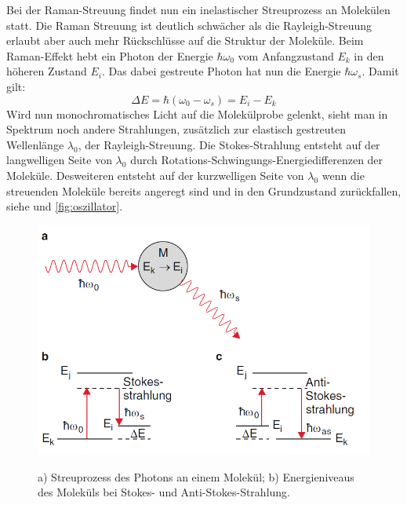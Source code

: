 \documentclass[.../bericht]{subfilies}
\begin{document}
      Bei der Raman-Streuung findet nun ein inelastischer Streuprozess an Molekülen statt. Die Raman Streuung ist deutlich schwächer als die Rayleigh-Streuung erlaubt aber auch mehr Rückschlüsse auf die Struktur der Moleküle. Beim Raman-Effekt hebt ein Photon der Energie $\hbar \omega_0$ vom Anfangzustand $E_k$ in den höheren Zustand $E_i$. Das dabei gestreute Photon hat nun die Energie $\hbar \omega_s$. Damit gilt:
      \begin{equation*}
        \Delta E= \hbar (\omega_0-\omega_s)=E_i-E_k
      \end{equation*}
      Wird nun monochromatisches Licht auf die Molekülprobe gelenkt, sieht man in Spektrum noch andere Strahlungen, zusätzlich zur elastisch gestreuten Wellenlänge $\lambda_0$, der Rayleigh-Streuung. Die Stokes-Strahlung entsteht auf der langwelligen Seite von $\lambda_0$  durch Rotations-Schwingungs-Energiedifferenzen der Moleküle. Desweiteren entsteht auf der kurzwelligen Seite von $\lambda_0$ wenn die streuenden Moleküle bereits angeregt sind und in den Grundzustand zurückfallen, siehe und \cref{fig:oszillator}.
      \begin{figure}[tb]
        \begin{center}
          \fbox
          {
            \includegraphics[scale=0.5]{figures/rayleighphoton}
            }
            \caption{a) Streuprozess des Photons an einem Molekül; b) Energieniveaus des Moleküls bei Stokes- und Anti-Stokes-Strahlung. \cite{dem:exp3}
          }
          \label{fig:anti-stokes}
        \end{center}
      \end{figure}
\end{document}
